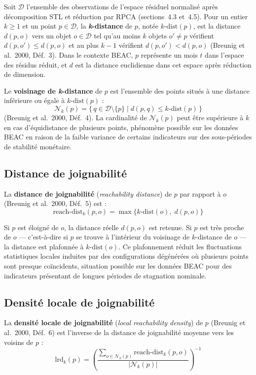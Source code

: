 \documentclass[12pt,a4paper]{article}
\begin{document}
Soit $\mathcal{D}$ l'ensemble des observations de l'espace résiduel normalisé
après décomposition STL et réduction par RPCA (sections~4.3 et~4.5). Pour un
entier $k \geq 1$ et un point $p \in \mathcal{D}$, la \textbf{\textit{k}-distance}
de $p$, notée $k\text{-dist}(p)$, est la distance $d(p, o)$ vers un objet
$o \in \mathcal{D}$ tel qu'au moins $k$ objets $o' \neq p$ vérifient
$d(p, o') \leq d(p, o)$ et au plus $k-1$ vérifient $d(p, o') < d(p, o)$
(Breunig et al.\ 2000, Déf.~3). Dans le contexte BEAC, $p$ représente un
mois $t$ dans l'espace des résidus réduit, et $d$ est la distance euclidienne
dans cet espace après réduction de dimension.

Le \textbf{voisinage de \textit{k}-distance} de $p$ est l'ensemble des points
situés à une distance inférieure ou égale à $k\text{-dist}(p)$ :
$$\mathcal{N}_k(p) = \bigl\{\, q \in \mathcal{D} \setminus \{p\}
\mid d(p, q) \leq k\text{-dist}(p) \,\bigr\}$$
(Breunig et al.\ 2000, Déf.~4). La cardinalité de $\mathcal{N}_k(p)$ peut
être supérieure à $k$ en cas d'équidistance de plusieurs points, phénomène
possible sur les données BEAC en raison de la faible variance de certains
indicateurs sur des sous-périodes de stabilité monétaire.

\subsection{Distance de joignabilité}

La \textbf{distance de joignabilité} (\textit{reachability distance}) de $p$
par rapport à $o$ (Breunig et al.\ 2000, Déf.~5) est :
$$\mathrm{reach\text{-}dist}_k(p, o) = \max \bigl\{
k\text{-dist}(o),\; d(p, o)
\bigr\}$$

Si $p$ est éloigné de $o$, la distance réelle $d(p, o)$ est retenue. Si $p$
est très proche de $o$ --- c'est-à-dire si $p$ se trouve à l'intérieur du
voisinage de $k$-distance de $o$ --- la distance est plafonnée à
$k\text{-dist}(o)$. Ce plafonnement réduit les fluctuations statistiques
locales induites par des configurations dégénérées où plusieurs points sont
presque coïncidents, situation possible sur les données BEAC pour des
indicateurs présentant de longues périodes de stagnation nominale.

\subsection{Densité locale de joignabilité}

La \textbf{densité locale de joignabilité} (\textit{local reachability density})
de $p$ (Breunig et al.\ 2000, Déf.~6) est l'inverse de la distance de
joignabilité moyenne vers les voisins de $p$ :
$$\mathrm{lrd}_k(p) = \left(
\frac{\displaystyle\sum_{o \in \mathcal{N}_k(p)}
\mathrm{reach\text{-}dist}_k(p, o)}
{\left|\mathcal{N}_k(p)\right|}
\right)^{-1}$$
\end{document}
